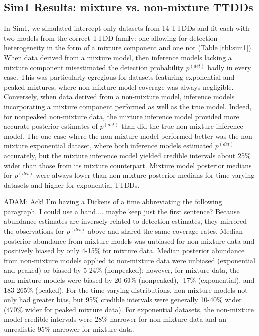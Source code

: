 \documentclass[useAMS,usenatbib,referee,12pt]{article}
\newcommand{\adam}[1]{{\color{blue} ADAM: #1}}
\begin{document}
\subsection{Sim1 Results: mixture vs. non-mixture TTDDs}\label{sec:mixture}

In Sim1, we simulated intercept-only datasets from 14 TTDDs and fit each with two models from the correct TTDD family: one allowing for detection heterogeneity in the form of a mixture component and one not (Table \ref{tbl:sim1}).  
When data derived from a mixture model, then inference models lacking a mixture component misestimated the detection probability $p^{(det)}$ badly in every case.  
This was particularly egregious for datasets featuring exponential and peaked mixtures, where non-mixture model coverage was always negligible.  
Conversely, when data derived from a non-mixture model, inference models incorporating a mixture component performed as well as the true model.  
Indeed, for nonpeaked non-mixture data, the mixture inference model provided more accurate posterior estimates of $p^{(det)}$ than did the true non-mixture inference model.  
The one case where the non-mixture model performed better was the non-mixture exponential dataset, where both inference models estimated $p^{(det)}$ accurately, but the mixture inference model yielded credible intervals about 25\% wider than those from its mixture counterpart.
Mixture model posterior medians for $p^{(det)}$ were always lower than non-mixture posterior medians for time-varying datasets and higher for exponential TTDDs.

\adam{Ack!  I'm having a Dickens of a time abbreviating the following paragraph.  I could use a hand.... maybe keep just the first sentence?}
Because abundance estimates are inversely related to detection estimates, they mirrored the observations for $p^{(det)}$ above and shared the same coverage rates.  
Median posterior abundance from mixture models was unbiased for non-mixture data and positively biased by only 4-15\% for mixture data.  
Median posterior abundance from non-mixture models applied to non-mixture data were unbiased (exponential and peaked) or biased by 5-24\% (nonpeaked); however, for mixture data, the non-mixture models were biased by 20-60\% (nonpeaked), -17\% (exponential), and 183-265\% (peaked).  
For the time-varying distributions, non-mixture models not only had greater bias, but 95\% credible intervals were generally 10-40\% wider (470\% wider for peaked mixture data).
For exponential datasets, the non-mixture model credible intervals were 28\% narrower for non-mixture data and an unrealistic 95\% narrower for mixture data.
\end{document}
